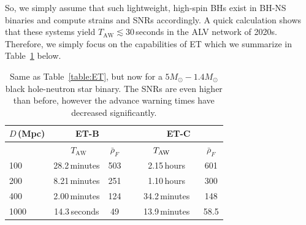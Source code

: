\documentclass[prd,amsmath,amssymb,aps,floats,amsfonts,notitlepage,superscriptaddress,eqsecnum,nofootinbib,10pt]{revtex4-1}
\newcommand\T{\rule{0pt}{2.6ex}}       %
\newcommand\B{\rule[-1.2ex]{0pt}{0pt}} %
\begin{document}
So, we simply assume that such lightweight, high-spin BHs exist in BH-NS binaries and compute strains and SNRs accordingly.
A quick calculation shows that these systems yield $T_\text{AW} \lesssim 30\,$seconds in the ALV network of 2020s. %
Therefore, we simply focus on the capabilities of ET which we summarize in Table~\ref{table:ET_BH_NS} below.
%
%
%
\begin{table}[h]
\centering
\begin{tabular}{lccccc}
\hline\hline
$D\,$(Mpc) & \multicolumn{2}{c}{ET-B} &  & \multicolumn{2}{c}{ET-C}\T\B\\
\hline
{}&  \ \hspace{6mm}$T_\text{AW}$ \hspace{8mm} & $\bar{\rho}_{F}$ &{}  & $\hspace{6mm}T_\text{AW} \hspace{10mm}$ & $\bar{\rho}_{F}$\T\B\\

100 &   28.2\,minutes & 503 &{\qquad} &  2.15\,hours & 601\T\\
200 & 8.21\,minutes & 251  &{\qquad} & 1.10\,hours & 300 \\
400 &  2.00\,minutes & 124 &{\qquad} & 34.2\,minutes & 148\\
1000 & 14.3\,seconds & 49 &{\qquad} & 13.9\,minutes& 58.5\\
\hline\hline
\end{tabular}
\caption{Same as Table~\ref{table:ET}, but now for a $5 M_\odot- 1.4 M_\odot$ black hole-neutron star binary.
The SNRs are even higher than before, however the advance warning times have decreased significantly.}\label{table:ET_BH_NS}
\end{table}
%
%
\end{document}
